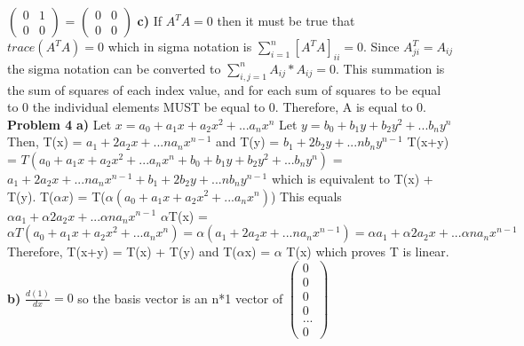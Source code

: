 \documentclass[12pt]{article}
\begin{document}
$\left(\begin{array}{cc} 0 & 1  \\ 0 & 0\end{array}\right)$ =
$\left(\begin{array}{cc} 0 & 0  \\ 0 & 0\end{array}\right)$
\newline
\textbf{c)}
\newline
If $A^{T}A = 0$ then it must be true that $trace(A^{T}A) = 0$ which in sigma notation is $\sum^{n}_{i=1} [A^{T}A]_{ii} = 0$. Since $A^{T}_{ji} = A_{ij}$ the sigma notation can be converted to $\sum^{n}_{i,j=1} A_{ij}*A_{ij} = 0$.
\newline
This summation is the sum of squares of each index value, and for each sum of squares to be equal to 0 the individual elements MUST be equal to 0. Therefore, A is equal to 0.
\newline
\newline
\textbf{Problem 4}
\newline
\textbf{a)}
\newline
Let $x = a_{0} + a_{1}x + a_{2}x^{2} + ... a_{n}x^{n}$
\newline
Let $y = b_{0} + b_{1}y + b_{2}y^{2} + ... b_{n}y^{n}$
\newline
Then, T(x) = $a_{1} +2a_{2}x + ... na_{n}x^{n-1}$ and
T(y) = $b_{1} +2b_{2}y + ... nb_{n}y^{n-1}$
\newline
T(x+y) = $T(a_{0} + a_{1}x + a_{2}x^{2} + ... a_{n}x^{n} + b_{0} + b_{1}y + b_{2}y^{2} + ... b_{n}y^{n})$ = 
\newline
$a_{1} +2a_{2}x + ... na_{n}x^{n-1} + b_{1} +2b_{2}y + ... nb_{n}y^{n-1}$ which is equivalent to T(x) + T(y).
\newline
T($\alpha x$) = T($\alpha (a_{0} + a_{1}x + a_{2}x^{2} + ... a_{n}x^{n})$)
\newline
This equals $\alpha a_{1} +\alpha 2a_{2}x + ... \alpha na_{n}x^{n-1}$
\newline
$\alpha$T(x) = $\alpha T(a_{0} + a_{1}x + a_{2}x^{2} + ... a_{n}x^{n}) = \alpha (a_{1} +2a_{2}x + ... na_{n}x^{n-1}) = \alpha a_{1} +\alpha 2a_{2}x + ... \alpha na_{n}x^{n-1}$
\newline
Therefore, T(x+y) = T(x) + T(y) and T($\alpha$x) = $\alpha$ T(x) which proves T is linear.
\newline
\newline
\textbf{b)}
\newline
$\frac{d(1)}{dx} = 0$ so the basis vector is an n*1 vector of $\left(\begin{array}{c} 0  \\ 0 \\ 0 \\ 0 \\ ... \\ 0  \end{array}\right)$ 
\end{document}
